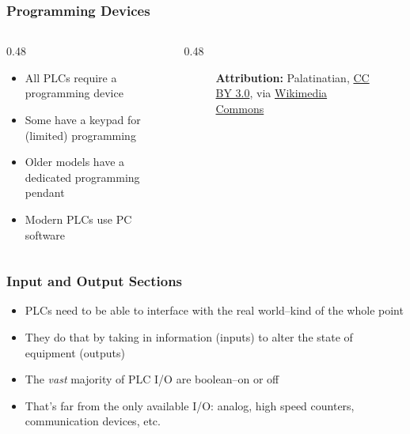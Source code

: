 \begin{frame}
    \frametitle{Programming Devices}
    
    \begin{columns}
        \begin{column}{0.48\linewidth}
            \begin{itemize}
                \item All PLCs require a programming device
                \item Some have a keypad for (limited) programming
                \item Older models have a dedicated programming pendant
                \item Modern PLCs use PC software
            \end{itemize}
        \end{column}
        \begin{column}{0.48\linewidth}
            \begin{figure}
                \centering

                {\tiny \textbf{Attribution:} Palatinatian, \href{https://creativecommons.org/licenses/by/3.0}{CC BY 3.0}, via \href{https://commons.wikimedia.org/wiki/File:S71500.JPG}{Wikimedia Commons}\par}
            \end{figure}
        \end{column}
    \end{columns}
\end{frame}

\begin{frame}
    \frametitle{Input and Output Sections}

    \begin{itemize}
        \item PLCs need to be able to interface with the real world--kind of the whole point
        \item They do that by taking in information (inputs) to alter the state of equipment (outputs)
        \item The \emph{vast} majority of PLC I/O are boolean--on or off
        \item That's far from the only available I/O: analog, high speed counters, communication devices, etc.
    \end{itemize}
\end{frame}


